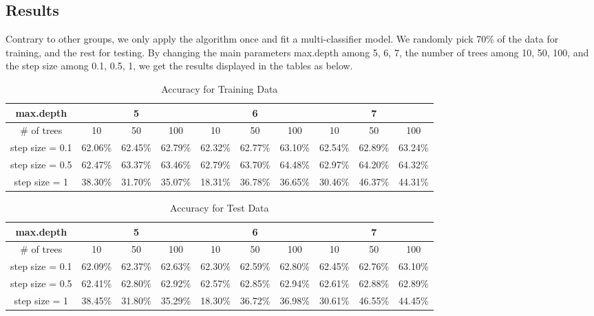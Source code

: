 \documentclass{article}
\begin{document}
\begin{spacing}{1}
\begin{large}
\subsection{Results}

\noindent \indent Contrary to other groups, we only apply the algorithm once and fit a multi-classifier model. We randomly pick 70\% of the data for training, and the rest for testing. By changing the main parameters \cite{xg3} max.depth among 5, 6, 7, the number of trees among 10, 50, 100, and the step size among 0.1, 0.5, 1, we get the results displayed in the tables as below.
\begin{table}[h]
\centering
\caption{Accuracy for Training Data}
\label{Accuracy for Training Data}
\begin{tabular}{cccccccccc}
\hline
max.depth       & \multicolumn{3}{c}{5} & \multicolumn{3}{c}{6} & \multicolumn{3}{c}{7} \\ \hline
\# of trees     & 10    & 50    & 100   & 10  & 50       & 100  & 10    & 50    & 100   \\
step size = 0.1 & 62.06\%    & 62.45\%     & 62.79\%     & 62.32\%    & 62.77\%         & 63.10\%      & 62.54\%     & 62.89\%      & 63.24\%      \\
step size = 0.5 & 62.47\%    & 63.37\%       & 63.46\%      & 62.79\%   & 63.70\%  & 64.48\%     & 62.97\%       & 64.20\%      & 64.32\%      \\
step size = 1   &38.30\%       & 31.70\%      &35.07\%       &18.31\%     & 36.78\%         &36.65\%      &30.46\%       &46.37\%       &44.31\%       \\ \hline
\end{tabular}
\end{table}

\begin{table}[h]
\centering
\caption{Accuracy for Test Data}
\label{Accuracy for Test Data}
\begin{tabular}{cccccccccc}
\hline
max.depth       & \multicolumn{3}{c}{5} & \multicolumn{3}{c}{6} & \multicolumn{3}{c}{7} \\ \hline
\# of trees     & 10    & 50    & 100   & 10  & 50       & 100  & 10    & 50    & 100   \\
step size = 0.1 & 62.09\%      & 62.37\%     & 62.63\%      &62.30\%     & 62.59\%       & 62.80\%      & 62.45\%      & 62.76\%      & 63.10\%      \\
step size = 0.5 & 62.41\%     & 62.80\%     & 62.92\%      & 62.57\%    &62.85\%     & 62.94\%   & 62.61\%      & 62.88\%      & 62.89\%      \\
step size = 1   &38.45\%       & 31.80\%      & 35.29\%      &18.30\%     & 36.72\%         &  36.98\% &30.61\%       &46.55\%      &44.45\%     \\ \hline
\end{tabular}
\end{table}


\end{large}
\end{spacing}
\end{document}
